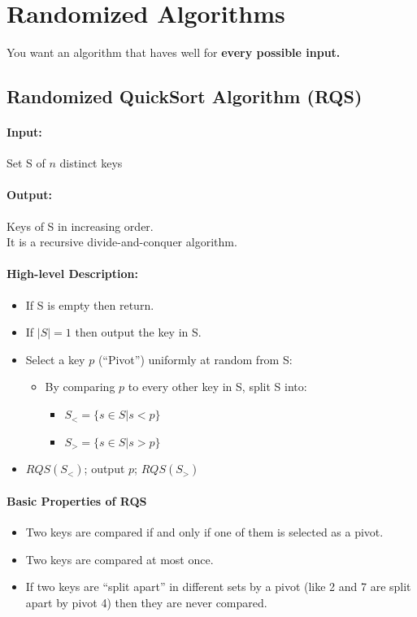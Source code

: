 \documentclass{article}
\begin{document}
\section{Randomized Algorithms}
You want an algorithm that haves well for \textbf{every possible input.}

\subsection{Randomized QuickSort Algorithm (RQS)}
\paragraph{Input: }Set S of $n$ distinct keys
\paragraph{Output: }Keys of S in increasing order.
\\
It is a recursive divide-and-conquer algorithm.
\paragraph{High-level Description: }
\begin{itemize}
\item If S is empty then return.
\item If $|S| =1$  then output the key in S.
\item Select a key $p$ (``Pivot'') uniformly at random from S:
\begin{itemize}
\item 
By comparing $p$ to every other key in S, split S into:
\begin{itemize}
\item 
$S_< = \{s \in S | s < p \}$
\item
$S_> = \{s \in S | s > p\}$
\end{itemize}
\end{itemize}
\item $RQS(S_<)$; output $p$; $RQS(S_>)$
\end{itemize}
\paragraph{Basic Properties of RQS}

\begin{itemize}
\item Two keys are compared if and only if one of them is selected as a pivot.
\item Two keys are compared at most once.
\item If two keys are ``split apart'' in different sets by a pivot (like 2 and 7 are split apart by pivot 4) then they are never compared.
\end{itemize}
\end{document}
